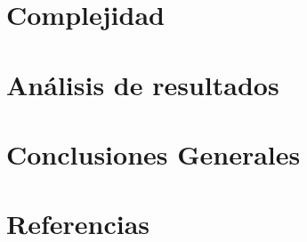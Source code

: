 \documentclass[a4paper,11pt] {article}
\begin{document}
\section*{Complejidad}

\section*{An\'alisis de resultados}

\section*{Conclusiones Generales}

\section*{Referencias}
\end{document}

